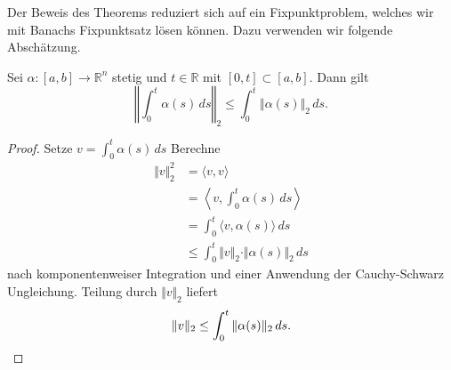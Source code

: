 \documentclass[../main.tex]{subfiles}
\begin{document}

Der Beweis des
Theorems reduziert sich auf ein Fixpunktproblem,
welches wir mit Banachs Fixpunktsatz lösen können.
Dazu verwenden wir folgende Abschätzung.

\begin{lemma}
  Sei $\alpha \colon [a, b] \to \mathbb{R}^n$ stetig
  und $t \in \mathbb{R}$ mit $[0, t] \subset [a, b]$.
  Dann gilt
  \[
    \left\Vert \int_{0}^{t} \alpha(s) \, ds \right\Vert_2
    \leq \int_{0}^{t} \Vert \alpha(s) \Vert_2 \, ds.
  \]
\end{lemma}

\begin{proof}
  Setze $v = \int_{0}^{t} \alpha(s) \, ds$
  Berechne
  \begin{align*}
    \Vert v \Vert_2^2 
    &= \langle v, v \rangle\\
    &= \left\langle v, \int_{0}^{t} \alpha(s) \, ds \right\rangle \\
    &= \int_{0}^{t} \langle v, \alpha(s) \rangle \, ds\\
    &\leq \int_{0}^{t} \Vert v \Vert_2 \cdot \Vert \alpha(s) \Vert_2 \, ds
  \end{align*}
  nach komponentenweiser Integration und einer Anwendung
  der Cauchy-Schwarz Ungleichung. Teilung durch $\Vert v \Vert_2$ liefert
  \[
    \Vert v \Vert_2 \leq \int_{0}^{t} \Vert \alpha(s)\Vert_2 \, ds.
    \qedhere
  \]
\end{proof}
\end{document}
